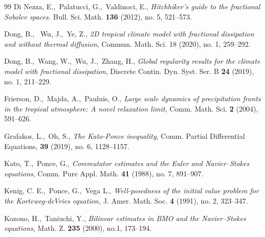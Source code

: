 \documentclass[a4paper]{article}
\begin{document}
\begin{thebibliography}{99}
  Di Nezza, E.,\ Palatucci, G.,\ Valdinoci, E.,
\emph{Hitchhiker's guide to the fractional Sobolev spaces.}
Bull. Sci. Math. \textbf{136} (2012), no. 5, 521--573.

 Dong, B., \ Wu, J.,\ Ye, Z., \emph{2D tropical climate model
with fractional dissipation and without thermal diffusion}, Commun.
Math. Sci. 18 (2020), no. 1, 259–292.
	
 Dong, B.,\ Wang, W.,\ Wu, J.,\ Zhang, H.,
  \emph{Global regularity results for the climate model with
    fractional dissipation}, Discrete Contin. Dyn. Syst. Ser. B
  \textbf{24} (2019), no. 1, 211--229.  

 Frierson, D.,\ Majda, A.,\ Pauluis, O., \emph{Large
    scale dynamics of precipitation fronts in the tropical atmosphere:
    A novel relaxation limit}, Comm. Math. Sci. \textbf{2} (2004),
  591--626.
      

 Grafakos, L.,\ Oh, S., \emph{The Kato-Ponce
    inequality}, Comm. Partial Differential Equations, \textbf{39}
  (2019), no. 6, 1128--1157.

    

 Kato, T.,\ Ponce, G., \emph{Commutator
    estimates and the Euler and Navier--Stokes equations}, Comm. Pure
  Appl. Math. \textbf{41} (1988), no. 7, 891--907.

 Kenig, C. E.,\ Ponce, G.,\ Vega L.,
  \emph{Well-posedness of the initial value problem for the
    Korteweg-deVries equation,} J. Amer. Math. Soc. \textbf{4} (1991),
  no. 2, 323--347.
    
 Kozono, H.,\ Taniuchi, Y., \emph{Bilinear
    estimates in BMO and the Navier--Stokes equations},
  Math. Z. \textbf{235} (2000), no.1, 173--194.
    

\end{thebibliography}
\end{document}

